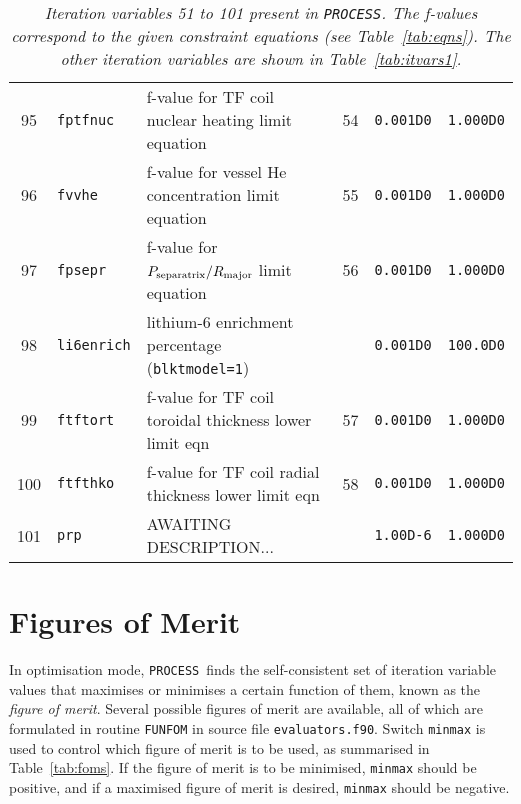 \documentclass[11pt,a4paper]{report}
\newcommand{\process}{\mbox{\texttt{PROCESS}}}
\begin{document}
\begin{table}[tbph]
\begin{center}
\begin{tabular}{||c|l|l|c|c|c||}
95  & \texttt{fptfnuc}  & f-value for TF coil nuclear heating limit equation      & 54  & \texttt{0.001D0} & \texttt{1.000D0} \\
96  & \texttt{fvvhe}    & f-value for vessel He concentration limit equation      & 55  & \texttt{0.001D0} & \texttt{1.000D0} \\
97  & \texttt{fpsepr}   & f-value for $P_{\mbox{\scriptsize separatrix}}/R_{\mbox{\scriptsize major}}$ limit equation & 56
  & \texttt{0.001D0} & \texttt{1.000D0} \\
98  & \texttt{li6enrich}& lithium-6 enrichment percentage (\texttt{blktmodel=1})  &     & \texttt{0.001D0} & \texttt{100.0D0} \\
99  & \texttt{ftftort}  & f-value for TF coil toroidal thickness lower limit eqn  & 57  & \texttt{0.001D0} & \texttt{1.000D0} \\
100 & \texttt{ftfthko}  & f-value for TF coil radial thickness lower limit eqn    & 58  & \texttt{0.001D0} & \texttt{1.000D0} \\
101 & \texttt{prp}      & AWAITING DESCRIPTION...                                 &     & \texttt{1.00D-6} & \texttt{1.000D0} \\
\hline
\end{tabular}
\end{center}
\caption[List of iteration variables 51 to 101]
{\label{tab:itvars2}
  \textit{Iteration variables 51 to 101 present in \process. The f-values correspond to the
    given constraint equations (see Table~\ref{tab:eqns}). The other iteration
    variables are shown in Table~\ref{tab:itvars1}.}
}
\end{table}
\normalsize


\section{Figures of Merit}
\label{sec:foms}

In optimisation mode, \process\ finds the self-consistent set of iteration
variable values that maximises or minimises a certain function of them, known
as the \textit{figure of merit}. Several possible figures of merit are
available, all of which are formulated in routine \texttt{FUNFOM} in source
file \texttt{evaluators.f90}.  Switch \texttt{minmax} is used to control which
figure of merit is to be used, as summarised in Table~\ref{tab:foms}. If the
figure of merit is to be minimised, \texttt{minmax} should be positive, and if
a maximised figure of merit is desired, \texttt{minmax} should be negative.
\end{document}
